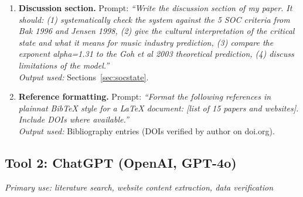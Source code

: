 \documentclass[12pt, a4paper]{article}
\begin{document}
\begin{enumerate}[label=\textbf{C\arabic*.}, leftmargin=*, itemsep=6pt]
  \item \textbf{Discussion section.}
  Prompt: \textit{``Write the discussion section of my paper.
  It should: (1) systematically check the system against the
  5 SOC criteria from Bak 1996 and Jensen 1998, (2) give the
  cultural interpretation of the critical state and what it
  means for music industry prediction, (3) compare the exponent
  alpha=1.31 to the Goh et al 2003 theoretical prediction,
  (4) discuss limitations of the model.''}\\
  \textit{Output used:} Sections~\ref{sec:socstate}.

  \item \textbf{Reference formatting.}
  Prompt: \textit{``Format the following references in plainnat
  BibTeX style for a LaTeX document: [list of 15 papers and
  websites]. Include DOIs where available.''}\\
  \textit{Output used:} Bibliography entries (DOIs verified
  by author on doi.org).

\end{enumerate}

\subsection*{Tool 2: ChatGPT (OpenAI, GPT-4o)}
\textit{Primary use: literature search, website content
extraction, data verification}
\end{document}
